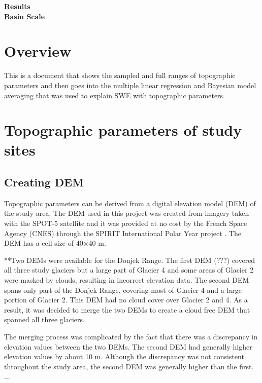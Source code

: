 \documentclass[12pt]{article}
\begin{document}

\begin{center}
\Large \textbf{Results\\ Basin Scale}
\end{center}

\section*{Overview}
This is a document that shows the sampled and full ranges of topographic parameters and then goes into the multiple linear regression and Bayesian model averaging that was used to explain SWE with topographic parameters. 

\tableofcontents
\pagebreak

\section{Topographic parameters of study sites}

\subsection{Creating DEM}

Topographic parameters can be derived from a digital elevation model (DEM) of the study area. The DEM used in this project was created from imagery taken with the SPOT-5 satellite and it was provided at no cost by the French Space Agency (CNES) through the SPIRIT International Polar Year project \citep{Korona2009}. The DEM has a cell size of 40$\times$40 m. 

**Two DEMs were available for the Donjek Range. The first DEM (???) covered all three study glaciers but a large part of Glacier 4 and some areas of Glacier 2 were masked by clouds, resulting in incorrect elevation data. The second DEM spans only part of the Donjek Range, covering most of Glacier 4 and a large portion of Glacier 2. This DEM had no cloud cover over Glacier 2 and 4. As a result, it was decided to merge the two DEMs to create a cloud free DEM that spanned all three glaciers. 

The merging process was complicated by the fact that there was a discrepancy in elevation values between the two DEMs. The second DEM had generally higher elevation values by about 10 m. Although the discrepancy was not consistent throughout the study area, the second DEM was generally higher than the first. ...
\end{document}
